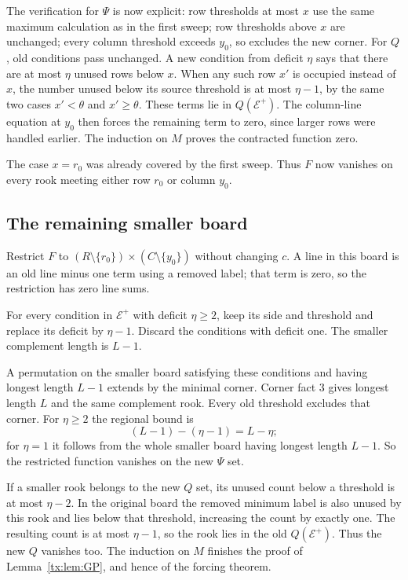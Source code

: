 The verification for $\Psi$ is now explicit: row thresholds at most $x$ use the same maximum calculation as in the first sweep; row thresholds above $x$ are unchanged; every column threshold exceeds $y_0$, so excludes the new corner. For $Q$, old conditions pass unchanged. A new condition from deficit $\eta$ says that there are at most $\eta$ unused rows below $x$. When any such row $x'$ is occupied instead of $x$, the number unused below its source threshold is at most $\eta-1$, by the same two cases $x'<\theta$ and $x'\ge\theta$. These terms lie in $Q(\mathcal E^+)$. The column-line equation at $y_0$ then forces the remaining term to zero, since larger rows were handled earlier. The induction on $M$ proves the contracted function zero.

The case $x=r_0$ was already covered by the first sweep. Thus $F$ now vanishes on every rook meeting either row $r_0$ or column $y_0$.

\subsection{The remaining smaller board}
Restrict $F$ to $(R\setminus\{r_0\})\times(C\setminus\{y_0\})$ without changing $c$. A line in this board is an old line minus one term using a removed label; that term is zero, so the restriction has zero line sums.

For every condition in $\mathcal E^+$ with deficit $\eta\ge2$, keep its side and threshold and replace its deficit by $\eta-1$. Discard the conditions with deficit one. The smaller complement length is $L-1$.

A permutation on the smaller board satisfying these conditions and having longest length $L-1$ extends by the minimal corner. Corner fact 3 gives longest length $L$ and the same complement rook. Every old threshold excludes that corner. For $\eta\ge2$ the regional bound is
\[(L-1)-(\eta-1)=L-\eta;
\]
for $\eta=1$ it follows from the whole smaller board having longest length $L-1$. So the restricted function vanishes on the new $\Psi$ set.

If a smaller rook belongs to the new $Q$ set, its unused count below a threshold is at most $\eta-2$. In the original board the removed minimum label is also unused by this rook and lies below that threshold, increasing the count by exactly one. The resulting count is at most $\eta-1$, so the rook lies in the old $Q(\mathcal E^+)$. Thus the new $Q$ vanishes too. The induction on $M$ finishes the proof of Lemma~\ref{tx:lem:GP}, and hence of the forcing theorem.


